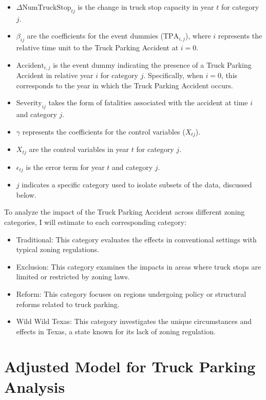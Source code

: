 \documentclass[
  12pt]{article}
\begin{document}
\begin{itemize}
\item
  \(\Delta\text{NumTruckStop}_{tj}\) is the change in truck stop
  capacity in year \(t\) for category \(j\).
\item
  \(\beta_{ij}\) are the coefficients for the event dummies
  (\(\text{TPA}_{i,j}\)), where \(i\) represents the relative time unit
  to the Truck Parking Accident at \(i = 0\).
\item
  \(\text{Accident}_{i,j}\) is the event dummy indicating the presence
  of a Truck Parking Accident in relative year \(i\) for category \(j\).
  Specifically, when \(i = 0\), this corresponds to the year in which
  the Truck Parking Accident occurs.
\item
  \(\text{Severity}_{ij}\) takes the form of fatalities associated with
  the accident at time \(i\) and category \(j\).
\item
  \(\gamma\) represents the coefficients for the control variables
  (\(X_{tj}\)).
\item
  \(X_{tj}\) are the control variables in year \(t\) for category \(j\).
\item
  \(\epsilon_{tj}\) is the error term for year \(t\) and category \(j\).
\item
  \(j\) indicates a specific category used to isolate subsets of the
  data, discussed below.
\end{itemize}

To analyze the impact of the Truck Parking Accident across different
zoning categories, I will estimate to each corresponding category:

\begin{itemize}
\item
  Traditional: This category evaluates the effects in conventional
  settings with typical zoning regulations.
\item
  Exclusion: This category examines the impacts in areas where truck
  stops are limited or restricted by zoning laws.
\item
  Reform: This category focuses on regions undergoing policy or
  structural reforms related to truck parking.
\item
  Wild Wild Texas: This category investigates the unique circumstances
  and effects in Texas, a state known for its lack of zoning regulation.
\end{itemize}

\section{Adjusted Model for Truck Parking
Analysis}\label{adjusted-model-for-truck-parking-analysis}
\end{document}
